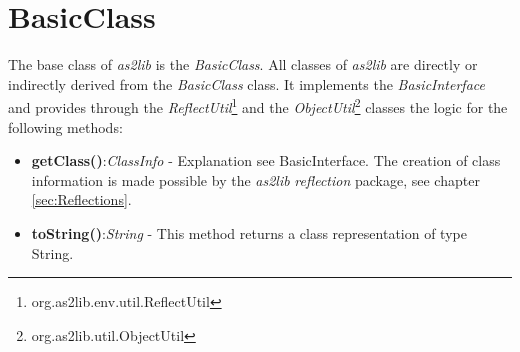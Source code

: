 \section{BasicClass}
\label{sec:BasicClass}

The base class of {\sl as2lib} is the \emph{BasicClass}. All classes of {\sl as2lib} are directly or indirectly derived from the \emph{BasicClass} class. It implements the \emph{BasicInterface} and provides through the \emph{ReflectUtil}\footnote{org.as2lib.env.util.ReflectUtil} and the \emph{ObjectUtil}\footnote{org.as2lib.util.ObjectUtil} classes the logic for the following methods:

\begin{itemize}
	\item \textbf{getClass()}:\textit{ClassInfo} - Explanation see BasicInterface. The creation of class information is made possible by the {\sl as2lib} \emph{reflection} package, see chapter \ref{sec:Reflections}.
	\item \textbf{toString()}:\textit{String} - This method returns a class representation of type String.
\end{itemize}
